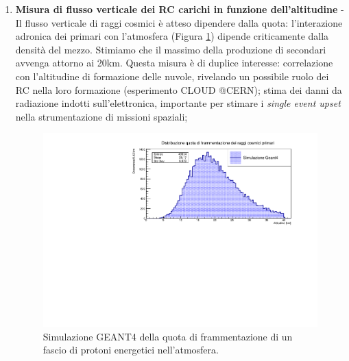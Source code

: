 \begin{enumerate}
    \item \textbf{Misura di flusso verticale dei RC carichi in funzione dell'altitudine} - Il flusso verticale di raggi cosmici è atteso dipendere dalla quota: l'interazione adronica dei primari con l'atmosfera (Figura \ref{frammentazione primari}) dipende criticamente dalla densità del mezzo. Stimiamo che il massimo della produzione di secondari avvenga attorno ai 20km. Questa misura è di duplice interesse: correlazione con l'altitudine di formazione delle nuvole, rivelando un possibile ruolo dei RC nella loro formazione (esperimento CLOUD @CERN); stima dei danni da radiazione indotti sull'elettronica, importante per stimare i \textit{single event upset} nella strumentazione di missioni spaziali;
    \begin{figure}
        \centering
        \includegraphics[width=0.9\linewidth]{Frammentazione_verticale.pdf}
        \caption{Simulazione GEANT4 della quota di frammentazione di un fascio di protoni energetici nell'atmosfera.}
        \label{frammentazione primari}
    \end{figure}
    

\end{enumerate}
